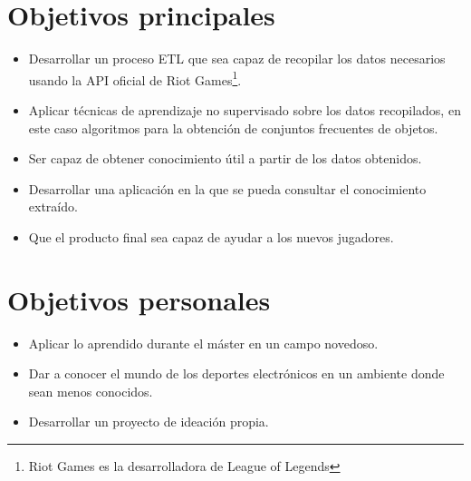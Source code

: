 
\section{Objetivos principales}
\begin{itemize}
    \item Desarrollar un proceso ETL que sea capaz de recopilar los datos necesarios usando la API oficial de Riot Games\footnote{Riot Games es la desarrolladora de League of Legends}.
    \item Aplicar técnicas de aprendizaje no supervisado sobre los datos recopilados, en este caso algoritmos para la obtención de conjuntos frecuentes de objetos.
    \item Ser capaz de obtener conocimiento útil a partir de los datos obtenidos.
    \item Desarrollar una aplicación en la que se pueda consultar el conocimiento extraído.
    \item Que el producto final sea capaz de ayudar a los nuevos jugadores.
\end{itemize}


\section{Objetivos personales}
\begin{itemize}
    \item Aplicar lo aprendido durante el máster en un campo novedoso.
    \item Dar a conocer el mundo de los deportes electrónicos en un ambiente donde sean menos conocidos.
    \item Desarrollar un proyecto de ideación propia.
\end{itemize}